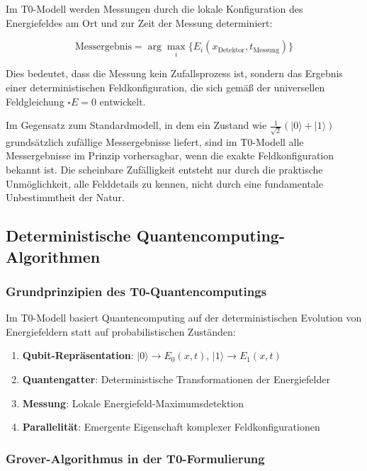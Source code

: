 \documentclass[12pt,a4paper]{article}
\theoremstyle{definition}
\begin{document}
	Im T0-Modell werden Messungen durch die lokale Konfiguration des Energiefeldes am Ort und zur Zeit der Messung determiniert:
	
	\begin{equation}
		\text{Messergebnis} = \arg\max_i\{E_i(x_{\text{Detektor}}, t_{\text{Messung}})\}
	\end{equation}
	
	Dies bedeutet, dass die Messung kein Zufallsprozess ist, sondern das Ergebnis einer deterministischen Feldkonfiguration, die sich gemäß der universellen Feldgleichung $\square E = 0$ entwickelt.
	
	\begin{wichtig}
		Im Gegensatz zum Standardmodell, in dem ein Zustand wie $\frac{1}{\sqrt{2}}(|0\rangle + |1\rangle)$ grundsätzlich zufällige Messergebnisse liefert, sind im T0-Modell alle Messergebnisse im Prinzip vorhersagbar, wenn die exakte Feldkonfiguration bekannt ist. Die scheinbare Zufälligkeit entsteht nur durch die praktische Unmöglichkeit, alle Felddetails zu kennen, nicht durch eine fundamentale Unbestimmtheit der Natur.
	\end{wichtig}
	
	\subsection{Deterministische Quantencomputing-Algorithmen}
	
	\subsubsection{Grundprinzipien des T0-Quantencomputings}
	
	Im T0-Modell basiert Quantencomputing auf der deterministischen Evolution von Energiefeldern statt auf probabilistischen Zuständen:
	
	\begin{enumerate}
		\item \textbf{Qubit-Repräsentation}: $|0\rangle \rightarrow E_0(x,t)$, $|1\rangle \rightarrow E_1(x,t)$
		\item \textbf{Quantengatter}: Deterministische Transformationen der Energiefelder
		\item \textbf{Messung}: Lokale Energiefeld-Maximumsdetektion
		\item \textbf{Parallelität}: Emergente Eigenschaft komplexer Feldkonfigurationen
	\end{enumerate}
	
	\subsubsection{Grover-Algorithmus in der T0-Formulierung}
	
\end{document}

